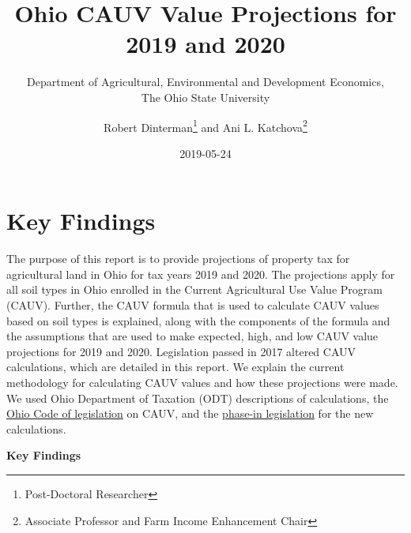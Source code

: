 \documentclass[]{article}
\title{Ohio CAUV Value Projections for 2019 and 2020}
\subtitle{Department of Agricultural, Environmental and Development Economics,\\
The Ohio State University}
\author{Robert Dinterman\footnote{Post-Doctoral Researcher} and Ani L.
Katchova\footnote{Associate Professor and Farm Income Enhancement Chair}}
\date{2019-05-24}
\begin{document}
\maketitle

\hypertarget{key-findings}{%
\section{Key Findings}\label{key-findings}}

The purpose of this report is to provide projections of property tax for
agricultural land in Ohio for tax years 2019 and 2020. The projections
apply for all soil types in Ohio enrolled in the Current Agricultural
Use Value Program (CAUV). Further, the CAUV formula that is used to
calculate CAUV values based on soil types is explained, along with the
components of the formula and the assumptions that are used to make
expected, high, and low CAUV value projections for 2019 and 2020.
Legislation passed in 2017 altered CAUV calculations, which are detailed
in this report. We explain the current methodology for calculating CAUV
values and how these projections were made. We used Ohio Department of
Taxation (ODT) descriptions of calculations, the
\href{http://codes.ohio.gov/orc/5713.31}{Ohio Code of legislation} on
CAUV, and the \href{http://codes.ohio.gov/orc/5715.01}{phase-in
legislation} for the new calculations.

\textbf{Key Findings}
\end{document}
